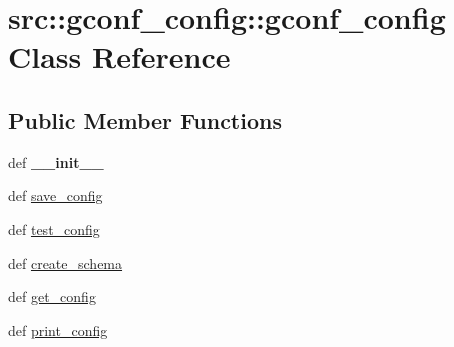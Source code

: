 \hypertarget{classsrc_1_1gconf__config_1_1gconf__config}{
\section{src::gconf\_\-config::gconf\_\-config Class Reference}
\label{classsrc_1_1gconf__config_1_1gconf__config}
}
\subsection*{Public Member Functions}
\begin{DoxyCompactItemize}
\item 
\hypertarget{classsrc_1_1gconf__config_1_1gconf__config_a7fb59f53672b72796e368e3be9842025}{
def {\bfseries \_\-\_\-init\_\-\_\-}}
\label{classsrc_1_1gconf__config_1_1gconf__config_a7fb59f53672b72796e368e3be9842025}

\item 
def \hyperlink{classsrc_1_1gconf__config_1_1gconf__config_a2ad8c1ace6a33abda2a24a31b451d0c7}{save\_\-config}
\item 
def \hyperlink{classsrc_1_1gconf__config_1_1gconf__config_a7decbc79d53fe7797a78e6f0172da553}{test\_\-config}
\item 
def \hyperlink{classsrc_1_1gconf__config_1_1gconf__config_aadcdef7accb9db59fc4a5e889dbe5210}{create\_\-schema}
\item 
def \hyperlink{classsrc_1_1gconf__config_1_1gconf__config_a70f3ca36142d127fb302a3e0f830f87b}{get\_\-config}
\item 
def \hyperlink{classsrc_1_1gconf__config_1_1gconf__config_a20fa19055fa1e81af06f5565c588f3f9}{print\_\-config}
\end{DoxyCompactItemize}
